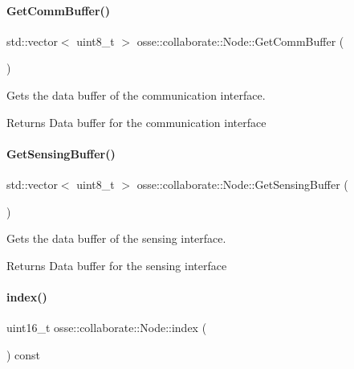 \paragraph{\texorpdfstring{Get\+Comm\+Buffer()}{GetCommBuffer()}}
{\footnotesize\ttfamily std\+::vector$<$ uint8\+\_\+t $>$ osse\+::collaborate\+::\+Node\+::\+Get\+Comm\+Buffer (\begin{DoxyParamCaption}{ }\end{DoxyParamCaption})}



Gets the data buffer of the communication interface. 

\begin{DoxyReturn}{Returns}
Data buffer for the communication interface 
\end{DoxyReturn}
\mbox{\label{classosse_1_1collaborate_1_1_node_a8ea0c9188f90cdb2b186ea6c43c3c9ed}} 
\paragraph{\texorpdfstring{Get\+Sensing\+Buffer()}{GetSensingBuffer()}}
{\footnotesize\ttfamily std\+::vector$<$ uint8\+\_\+t $>$ osse\+::collaborate\+::\+Node\+::\+Get\+Sensing\+Buffer (\begin{DoxyParamCaption}{ }\end{DoxyParamCaption})}



Gets the data buffer of the sensing interface. 

\begin{DoxyReturn}{Returns}
Data buffer for the sensing interface 
\end{DoxyReturn}
\mbox{\label{classosse_1_1collaborate_1_1_node_a07b4c8d3cdb8859e50a604a584c04a55}} 
\paragraph{\texorpdfstring{index()}{index()}}
{\footnotesize\ttfamily uint16\+\_\+t osse\+::collaborate\+::\+Node\+::index (\begin{DoxyParamCaption}{ }\end{DoxyParamCaption}) const\hspace{0.3cm}{\ttfamily [inline]}}



